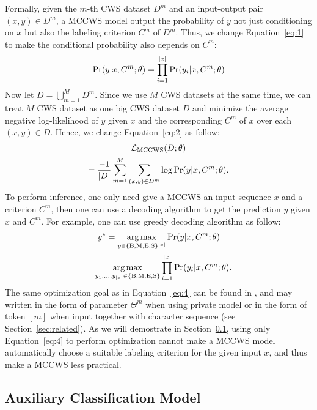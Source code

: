 \documentclass[11pt]{article}
\newcommand{\set}[1]{\lbrace #1 \rbrace}
\newcommand{\loss}{\mathcal{L}}
\newcommand{\BTag}{\operatorname{B}}
\newcommand{\MTag}{\operatorname{M}}
\newcommand{\ETag}{\operatorname{E}}
\newcommand{\STag}{\operatorname{S}}
\newcommand{\TagSet}{\set{\BTag, \MTag, \ETag, \STag}}
\newcommand{\opMCCWS}{\operatorname{MCCWS}}
\DeclareMathOperator*{\argmax}{\arg\max}
\DeclarePairedDelimiter{\abs}{\lvert}{\rvert}
\begin{document}
Formally, given the \(m\)-th CWS dataset \(D^m\) and an input-output pair \((x, y) \in D^m\), a MCCWS model output the probability of \(y\) not just conditioning on \(x\) but also the labeling criterion \(C^m\) of \(D^m\).
Thus, we change Equation~\eqref{eq:1} to make the conditional probability also depends on \(C^m\):
\begin{equation}\label{eq:3}
  \Pr(y | x, C^m ; \theta) = \prod_{i = 1}^{\abs{x}} \Pr(y_i | x, C^m ; \theta)
\end{equation}
Now let \(D = \bigcup_{m = 1}^M D^m\).
Since we use \(M\) CWS datasets at the same time, we can treat \(M\) CWS dataset as one big CWS dataset \(D\) and minimize the average negative log-likelihood of \(y\) given \(x\) and the corresponding \(C^m\) of \(x\) over each \((x, y) \in D\).
Hence, we change Equation~\eqref{eq:2} as follow:
\begin{multline}\label{eq:4}
  \loss_{\opMCCWS}(D ; \theta) \\
  = \dfrac{-1}{\abs{D}} \sum_{m = 1}^M \sum_{(x, y) \in D^m} \log \Pr(y|x, C^m ; \theta).
\end{multline}
To perform inference, one only need give a MCCWS an input sequence \(x\) and a criterion \(C^m\), then one can use a decoding algorithm to get the prediction \(y\) given \(x\) and \(C^m\).
For example, one can use greedy decoding algorithm as follow:
\begin{multline}\label{eq:5}
  y^* = \argmax_{y \in \TagSet^{\abs{x}}} \Pr(y | x, C^m ; \theta) \\
  = \argmax_{y_1, \dots, y_{\abs{x}} \in \TagSet} \prod_{i = 1}^{\abs{x}} \Pr(y_i | x, C^m ; \theta).
\end{multline}
The same optimization goal as in Equation~\eqref{eq:4} can be found in \citep{chen-etal-2017-adversarial,He-2019-effective,Gong-2019-switch,huang-etal-2020-towards,huang-etal-2020-joint-multiple,ke2020unified,qiu-etal-2020-concise,ke-etal-2021-pre}, and may written in the form of parameter \(\Theta^m\) when using private model or in the form of token \([m]\) when input together with character sequence (see Section~\ref{sec:related}).
As we will demostrate in Section~\ref{sec:class}, using only Equation~\eqref{eq:4} to perform optimization cannot make a MCCWS model automatically choose a suitable labeling criterion for the given input \(x\), and thus make a MCCWS less practical.

\subsection{Auxiliary Classification Model}\label{sec:class}
\end{document}
